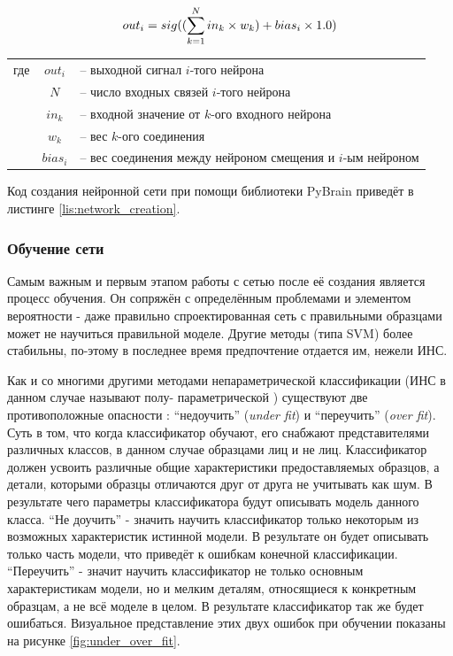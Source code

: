 \documentclass[12pt]{report}
\begin{document}
\begin{equation}
\label{eq:bias_calc}
\centering
out_i=sig((\sum_{k=1}^{N}{in_k \times w_k}) + bias_i \times 1.0)
\end{equation}

\begin{tabular}{p{3cm} c l}
где & $out_i$ & -- выходной сигнал $i$-того нейрона\\
	& $N$ & -- число входных связей $i$-того нейрона\\
	& $in_k$ & -- входной значение от $k$-ого входного нейрона\\
	& $w_k$ & -- вес $k$-ого соединения\\
	& $bias_i$ & -- вес соединения между нейроном смещения и $i$-ым нейроном\\
\end{tabular}

Код создания нейронной сети при помощи библиотеки PyBrain приведёт в листинге \ref{lis:network_creation}. 
\lstset{caption=Создание сети со скрытым слоем и без него.,
label=lis:network_creation,
basicstyle=\footnotesize\ttfamily,
captionpos=b,
breaklines=true,
breakatwhitespace=false,
numbers=left,
numbersep=5pt,
language=Python,
}



\subsubsection{Обучение сети}
Самым важным и первым этапом работы с сетью после её создания является процесс обучения. Он сопряжён с определённым 
проблемами и элементом вероятности - даже правильно спроектированная сеть с правильными образцами может не 
научиться 
правильной моделе. Другие методы (типа SVM) более стабильны, по-этому в последнее время предпочтение отдается им, 
нежели ИНС.

Как и со многими другими методами непараметрической классификации (ИНС в данном случае называют полу-
параметрической 
\citep{xu2006color}) существуют две противоположные опасности %
: ``недоучить'' (\textit{under fit}) и ``переучить'' (\textit{over fit}). Суть в том, что когда классификатор 
обучают, его снабжают представителями различных классов, в данном случае образцами лиц и не лиц. Классификатор 
должен 
усвоить различные общие характеристики предоставляемых образцов, а детали, которыми образцы отличаются друг от 
друга 
не учитывать как шум. В результате чего параметры классификатора будут описывать модель данного класса. ``Не
доучить'' - значить научить классификатор только некоторым из возможных характеристик истинной модели. В результате 
он будет описывать только часть модели, что приведёт к ошибкам конечной классификации. ``Переучить'' - значит 
научить 
классификатор не только основным характеристикам модели, но и мелким деталям, относящиеся к конкретным образцам, а 
не 
всё моделе в целом. В результате классификатор так же будет ошибаться. \citep{bradski2008learning} Визуальное 
представление этих двух ошибок при обучении показаны на рисунке \ref{fig:under_over_fit}.
\end{document}
